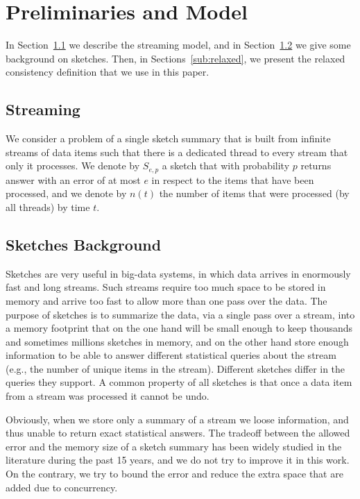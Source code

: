 \section{Preliminaries and Model}
\label{sec:sketches}

In Section~\ref{sub:streaming} we describe the streaming model,
and in Section~\ref{sub:background} we give some background on 
sketches. 
Then, in Sections~\ref{sub:relaxed}, we present the relaxed
consistency definition that we use in this paper.

\subsection{Streaming}
\label{sub:streaming}


We consider a problem of a single sketch summary that is built
from infinite streams of data items such that there is a
dedicated thread to every stream that only it processes.
We denote by $S_{e,p}$ a sketch that with probability $p$
returns answer with an error of at most $e$ in respect to the
items that have been processed, and we denote by $n(t)$ the
number of items that were processed (by all threads) by time
$t$.

\subsection{Sketches Background}
\label{sub:background}

Sketches are very useful in big-data systems, in which data
arrives in enormously fast and long streams.
Such streams require too much space to be stored in memory and
arrive too fast to allow more than one pass over the data.
The purpose of sketches is to summarize the data, via a single
pass over a stream, into a memory footprint that on the one hand
will be small enough to keep thousands and sometimes millions
sketches in memory, and on the other hand store enough
information to be able to answer different statistical queries
about the stream (e.g., the number of unique items in the stream).
Different sketches differ in the queries they support.
A common property of all sketches is that once a data item from
a stream was processed it cannot be undo.

Obviously, when we store only a summary of a stream we loose 
information, and thus unable to return exact statistical
answers.
The tradeoff between the allowed error and the memory size of a
sketch summary has been widely studied in the literature during
the past 15 years, and we do not try to improve it in this work.
On the contrary, we try to bound the error and reduce the extra
space that are added due to concurrency.


